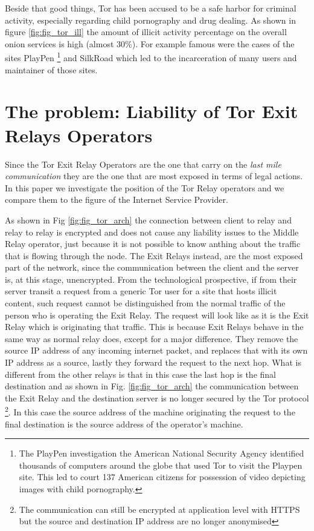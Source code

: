 \documentclass[runningheads,a4paper]{llncs}
\begin{document}
Beside that good things, Tor has been accused to be a safe harbor for criminal activity, especially regarding child pornography and drug dealing. As shown in figure \ref{fig:fig_tor_ill} the amount of illicit activity percentage on the overall onion services is high (almost 30\%). For example famous were the cases of the sites PlayPen
\footnote{
The PlayPen investigation the American National Security Agency identified thousands of computers around the globe that used Tor to visit the Playpen site. This led to court 137 American citizens for possession of video depicting images with child pornography.} and SilkRoad which led to the incarceration of many users and maintainer of those sites. 

\section{The problem: Liability of Tor Exit Relays Operators}\label{the_problem}
Since the Tor Exit Relay Operators are the one that carry on the \textit{last mile communication} they are the one that are most exposed in terms of legal actions.
In this paper we investigate the position of the Tor Relay operators and we compare them to the figure of the Internet Service Provider.

As shown in Fig \ref{fig:fig_tor_arch} the connection between client to relay and relay to relay is encrypted
and does not cause any liability issues to the Middle Relay operator, just because it is not possible to know anthing about the traffic that is flowing through the node. The Exit Relays instead, are the most exposed part of the network, since the communication between the client and the server is, at this stage, unencrypted. From the technological prospective, if from their server transit a request from a generic Tor user for a site that hosts illicit content, such request cannot be distinguished from the normal traffic of the person who is operating the Exit Relay. 
The request will look like as it is the Exit Relay which is originating that traffic. This is because Exit Relays behave in the same way as normal relay does, except for a major difference. They remove the source IP address of any incoming internet packet, and replaces that with its own IP address as a source, lastly they forward the request to the next hop. What is different from the other relays is that in this case the last hop is the final destination and as shown in Fig. \ref{fig:fig_tor_arch} the communication between the Exit Relay and the destination server is no longer secured by the Tor protocol \footnote{The communication can still be encrypted at application level with HTTPS but the source and destination IP address are no longer anonymised}. In this case the source address of the machine originating the request to the final destination is the source address of the operator's machine.
   
\end{document}
